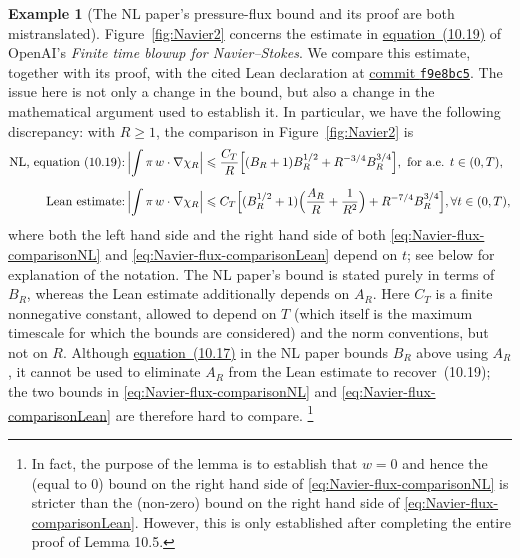 \documentclass[10pt, a4paper, reqno]{amsart}
\numberwithin{equation}{section}
\renewcommand{\geq}{\geqslant}
\renewcommand{\leq}{\leqslant}
\theoremstyle{definition}
\newtheorem{example}[theorem]{Example}
\theoremstyle{definition}
\newcounter{constant}
\begin{document}
\begin{example}[The NL paper's pressure-flux bound and its proof are both mistranslated]\label{ex:Navier_weak}
Figure~\ref{fig:Navier2} concerns the estimate in
\href{https://cdn.openai.com/pdf/32d9f210-8b73-45e0-91bc-82a30aef8a9a/navier-stokes.pdf\#page=123}{equation~(10.19)}
of OpenAI's \emph{Finite time blowup for Navier--Stokes}.
We compare this estimate, together with its proof, with the cited Lean declaration at
\href{https://github.com/openai/NavierStokesAndEuler/tree/f9e8bc5b38b6e212696e8a30e3e91517af887bbd}{commit \texttt{f9e8bc5}}.
The issue here is not only a change in the bound, but also a change in the mathematical argument used to establish it. In particular, we have the following discrepancy: with $R\geq1$, the comparison in Figure~\ref{fig:Navier2} is
\begin{align} 
 \text{NL, equation (10.19):}\,
 &\Bigl|\int \pi\, w\cdot\nabla\chi_R\Bigr|
 \leq \frac{C_T}{R}\Bigl[(B_R+1)B_R^{1/2}+R^{-3/4}B_R^{3/4}\Bigr], \text{ for a.e. } t \in (0, T),
 \label{eq:Navier-flux-comparisonNL}\\[2mm]
 \text{Lean estimate:}\,
 &\Bigl|\int \pi\, w\cdot\nabla\chi_R\Bigr|
 \leq C_T\Bigl[(B_R^{1/2}+1)\Bigl(\frac{A_R}{R}+\frac{1}{R^2}\Bigr)+R^{-7/4}B_R^{3/4}\Bigr], \forall t \in (0,T) \label{eq:Navier-flux-comparisonLean},
\end{align}
where both the left hand side and the right hand side of both \eqref{eq:Navier-flux-comparisonNL} and \eqref{eq:Navier-flux-comparisonLean} depend on $t$; see below for explanation of the notation. 
The NL paper's bound is stated purely in terms of $B_R$, whereas the Lean estimate additionally depends on $A_R$. Here $C_T$ is a finite nonnegative constant, allowed to depend on $T$ (which itself is the maximum timescale for which the bounds are considered) and the norm conventions, but not on $R$. Although \href{https://cdn.openai.com/pdf/32d9f210-8b73-45e0-91bc-82a30aef8a9a/navier-stokes.pdf\#page=122}{equation~(10.17)} in the NL paper bounds $B_R$ above using $A_R$, it cannot be used to eliminate $A_R$ from the Lean estimate to recover~(10.19); the two bounds in \eqref{eq:Navier-flux-comparisonNL} and \eqref{eq:Navier-flux-comparisonLean} are therefore hard to compare. \footnote{In fact, the purpose of the lemma is to establish that $w = 0$ and hence the (equal to $0$) bound on the right hand side of \eqref{eq:Navier-flux-comparisonNL} is stricter than the (non-zero) bound on the right hand side of \eqref{eq:Navier-flux-comparisonLean}. However, this is only established after completing the entire proof of Lemma 10.5.}



\end{example}
\end{document}
